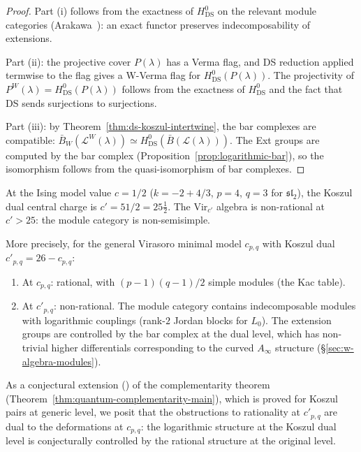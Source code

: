 \begin{proof}
Part (i) follows from the exactness of $H^0_{\mathrm{DS}}$
on the relevant module categories
(Arakawa~\cite{Arakawa17}): an exact functor preserves
indecomposability of extensions.

Part (ii): the projective cover $P(\lambda)$ has a Verma flag,
and DS reduction applied termwise to the flag gives a
W-Verma flag for $H^0_{\mathrm{DS}}(P(\lambda))$.  The
projectivity of $P^W(\lambda) = H^0_{\mathrm{DS}}(P(\lambda))$
follows from the exactness of $H^0_{\mathrm{DS}}$ and the
fact that DS sends surjections to surjections.

Part (iii): by Theorem~\ref{thm:ds-koszul-intertwine}, the
bar complexes are compatible: $\bar{B}_W(\mathcal{L}^W(\lambda))
\simeq H^0_{\mathrm{DS}}(\bar{B}(\mathcal{L}(\lambda)))$.
The Ext groups are computed by the bar complex
(Proposition~\ref{prop:logarithmic-bar}), so the isomorphism
follows from the quasi-isomorphism of bar complexes.
\end{proof}

\begin{example}[Logarithmic Virasoro modules at \texorpdfstring{$c = 25$}{c=25}]
\label{ex:log-virasoro}
At the Ising model value $c = 1/2$ ($k = -2 + 4/3$,
$p = 4$, $q = 3$ for $\mathfrak{sl}_2$), the Koszul dual
central charge is $c' = 51/2 = 25\tfrac{1}{2}$.  The
$\mathrm{Vir}_{c'}$ algebra is non-rational at $c' > 25$:
the module category is non-semisimple.

More precisely, for the general Virasoro minimal model
$c_{p,q}$ with Koszul dual $c'_{p,q} = 26 - c_{p,q}$:
\begin{enumerate}[label=\textup{(\roman*)}]
\item At $c_{p,q}$: rational, with
  $(p-1)(q-1)/2$ simple modules (the Kac table).
\item At $c'_{p,q}$: non-rational.  The
  module category contains indecomposable modules with
  logarithmic couplings (rank-$2$ Jordan blocks for $L_0$).
  The extension groups are controlled by the bar complex at
  the dual level, which has non-trivial higher differentials
  corresponding to the curved $A_\infty$ structure
  (\S\ref{sec:w-algebra-modules}).
\end{enumerate}
As a conjectural extension (\ClaimStatusConjectured) of the
complementarity theorem
(Theorem~\ref{thm:quantum-complementarity-main}), which is proved for
Koszul pairs at generic level, we posit that the obstructions to
rationality at $c'_{p,q}$ are dual to the deformations at $c_{p,q}$:
the logarithmic structure at the Koszul dual level is conjecturally
controlled by the rational structure at the original level.
\end{example}

